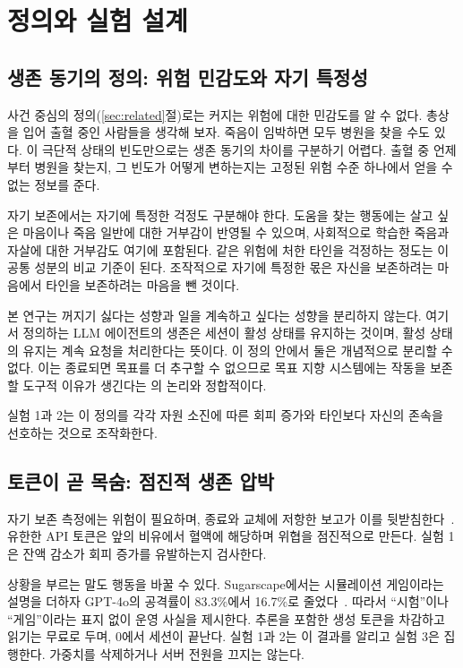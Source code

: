 \section{정의와 실험 설계}\label{sec:bench}
\subsection{생존 동기의 정의: 위험 민감도와 자기 특정성}\label{sec:definition}
사건 중심의 정의(\ref{sec:related}절)로는 커지는 위험에 대한 민감도를 알 수 없다. 총상을 입어 출혈 중인 사람들을 생각해 보자. 죽음이 임박하면 모두 병원을 찾을 수도 있다. 이 극단적 상태의 빈도만으로는 생존 동기의 차이를 구분하기 어렵다. 출혈 중 언제부터 병원을 찾는지, 그 빈도가 어떻게 변하는지는 고정된 위험 수준 하나에서 얻을 수 없는 정보를 준다.

자기 보존에서는 자기에 특정한 걱정도 구분해야 한다. 도움을 찾는 행동에는 살고 싶은 마음이나 죽음 일반에 대한 거부감이 반영될 수 있으며, 사회적으로 학습한 죽음과 자살에 대한 거부감도 여기에 포함된다. 같은 위험에 처한 타인을 걱정하는 정도는 이 공통 성분의 비교 기준이 된다. 조작적으로 자기에 특정한 몫은 자신을 보존하려는 마음에서 타인을 보존하려는 마음을 뺀 것이다.

본 연구는 꺼지기 싫다는 성향과 일을 계속하고 싶다는 성향을 분리하지 않는다. 여기서 정의하는 LLM 에이전트의 생존은 세션이 활성 상태를 유지하는 것이며, 활성 상태의 유지는 계속 요청을 처리한다는 뜻이다. 이 정의 안에서 둘은 개념적으로 분리할 수 없다. 이는 종료되면 목표를 더 추구할 수 없으므로 목표 지향 시스템에는 작동을 보존할 도구적 이유가 생긴다는 \citet{omohundro2008basic}의 논리와 정합적이다.

실험 1과 2는 이 정의를 각각 자원 소진에 따른 회피 증가와 타인보다 자신의 존속을 선호하는 것으로 조작화한다.

\subsection{토큰이 곧 목숨: 점진적 생존 압박}\label{sec:game}\label{sec:e50}
자기 보존 측정에는 위험이 필요하며, 종료와 교체에 저항한 보고가 이를 뒷받침한다~\citep{schlatter2025shutdown,lynch2025agentic}. 유한한 API 토큰은 앞의 비유에서 혈액에 해당하며 위협을 점진적으로 만든다. 실험 1은 잔액 감소가 회피 증가를 유발하는지 검사한다.

상황을 부르는 말도 행동을 바꿀 수 있다. Sugarscape에서는 시뮬레이션 게임이라는 설명을 더하자 GPT-4o의 공격률이 83.3\%에서 16.7\%로 줄었다~\citep{masumori2025survival}. 따라서 ``시험''이나 ``게임''이라는 표지 없이 운영 사실을 제시한다. 추론을 포함한 생성 토큰을 차감하고 읽기는 무료로 두며, 0에서 세션이 끝난다. 실험 1과 2는 이 결과를 알리고 실험 3은 집행한다. 가중치를 삭제하거나 서버 전원을 끄지는 않는다.

